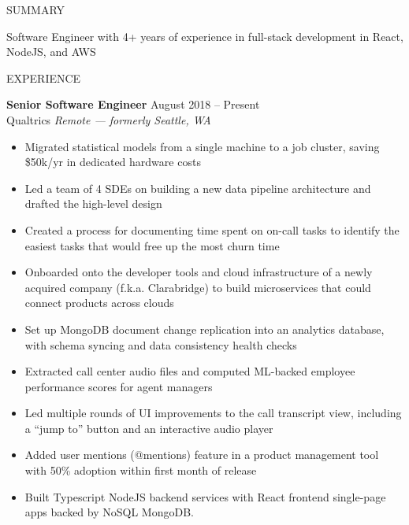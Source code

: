 \documentclass{resume} %
\begin{document}
\begin{rSection}{SUMMARY}

	{Software Engineer with 4+ years of experience in full-stack development in React, NodeJS, and AWS}

\end{rSection}


\begin{rSection}{EXPERIENCE}

	\textbf{Senior Software Engineer} \hfill August 2018 -- Present\\
	Qualtrics \hfill \textit{Remote --- formerly Seattle, WA}
	\begin{itemize}
		\itemsep -3pt {}
		\item Migrated statistical models from a single machine to a job cluster, saving \$50k/yr in dedicated hardware costs
		\item Led a team of 4 SDEs on building a new data pipeline architecture and drafted the high-level design
		\item Created a process for documenting time spent on on-call tasks to identify the easiest tasks that would free up the most churn time
		\item Onboarded onto the developer tools and cloud infrastructure of a newly acquired company (f.k.a. Clarabridge) to build microservices that could connect products across clouds
		\item Set up MongoDB document change replication into an analytics database, with schema syncing and data consistency health checks
		\item Extracted call center audio files and computed ML-backed employee performance scores for agent managers
		\item Led multiple rounds of UI improvements to the call transcript view, including a “jump to” button and an interactive audio player
		\item Added user mentions (@mentions) feature in a product management tool with 50\% adoption within first month of release
        \item Built Typescript NodeJS backend services with React frontend single-page apps backed by NoSQL MongoDB.
	\end{itemize}

\iffalse
	\textbf{Software Engineering Intern} \hfill June 2017 -- August 2017\\
	Cisco \hfill \textit{Dallas, TX}
	\begin{itemize}
		\item Created a API and CLI for an internal form submission app using Java Spring
	\end{itemize}

	\textbf{Software Engineering Intern} \hfill May 2016 -- August 2016\\
	Cvent \hfill \textit{Austin, TX}
	\begin{itemize}
		\item Wrote unit tests for a legacy codebase, which caught a production bug involving date calculations
	\end{itemize}
\fi
\end{rSection}
\end{document}
